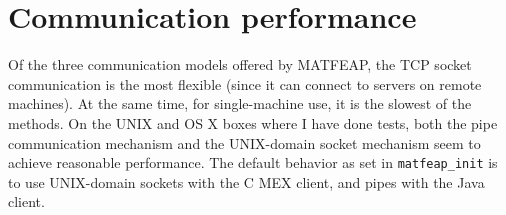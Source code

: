\documentclass{report}
\begin{document}
\section{Communication performance}

Of the three communication models offered by MATFEAP, the TCP socket
communication is the most flexible (since it can connect to servers on
remote machines).  At the same time, for single-machine use, it is the
slowest of the methods.  On the UNIX and OS X boxes where I have done
tests, both the pipe communication mechanism and the UNIX-domain
socket mechanism seem to achieve reasonable performance.  The default
behavior as set in {\tt matfeap\_init} is to use UNIX-domain sockets
with the C MEX client, and pipes with the Java client.


\end{document}
